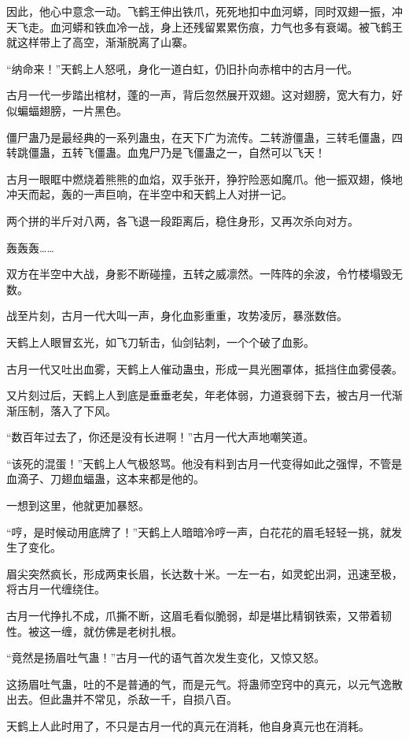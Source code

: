 \begin{this_body}
因此，他心中意念一动。飞鹤王伸出铁爪，死死地扣中血河蟒，同时双翅一振，冲天飞走。血河蟒和铁血冷一战，身上还残留累累伤痕，力气也多有衰竭。被飞鹤王就这样带上了高空，渐渐脱离了山寨。

“纳命来！”天鹤上人怒吼，身化一道白虹，仍旧扑向赤棺中的古月一代。

古月一代一步踏出棺材，蓬的一声，背后忽然展开双翅。这对翅膀，宽大有力，好似蝙蝠翅膀，一片黑色。

僵尸蛊乃是最经典的一系列蛊虫，在天下广为流传。二转游僵蛊，三转毛僵蛊，四转跳僵蛊，五转飞僵蛊。血鬼尸乃是飞僵蛊之一，自然可以飞天！

古月一眼眶中燃烧着熊熊的血焰，双手张开，狰狞险恶如魔爪。他一振双翅，倏地冲天而起，轰的一声巨响，在半空中和天鹤上人对拼一记。

两个拼的半斤对八两，各飞退一段距离后，稳住身形，又再次杀向对方。

轰轰轰……

双方在半空中大战，身影不断碰撞，五转之威凛然。一阵阵的余波，令竹楼塌毁无数。

战至片刻，古月一代大叫一声，身化血影重重，攻势凌厉，暴涨数倍。

天鹤上人眼冒玄光，如飞刀斩击，仙剑钻刺，一个个破了血影。

古月一代又吐出血雾，天鹤上人催动蛊虫，形成一具光圈罩体，抵挡住血雾侵袭。

又片刻过后，天鹤上人到底是垂垂老矣，年老体弱，力道衰弱下去，被古月一代渐渐压制，落入了下风。

“数百年过去了，你还是没有长进啊！”古月一代大声地嘲笑道。

“该死的混蛋！”天鹤上人气极怒骂。他没有料到古月一代变得如此之强悍，不管是血滴子、刀翅血蝠蛊，这本来都是他的。

一想到这里，他就更加暴怒。

“哼，是时候动用底牌了！”天鹤上人暗暗冷哼一声，白花花的眉毛轻轻一挑，就发生了变化。

眉尖突然疯长，形成两束长眉，长达数十米。一左一右，如灵蛇出洞，迅速至极，将古月一代缠绕住。

古月一代挣扎不成，爪撕不断，这眉毛看似脆弱，却是堪比精钢铁索，又带着韧性。被这一缠，就仿佛是老树扎根。

“竟然是扬眉吐气蛊！”古月一代的语气首次发生变化，又惊又怒。

这扬眉吐气蛊，吐的不是普通的气，而是元气。将蛊师空窍中的真元，以元气逸散出去。但此蛊并不常见，杀敌一千，自损八百。

天鹤上人此时用了，不只是古月一代的真元在消耗，他自身真元也在消耗。


\end{this_body}

